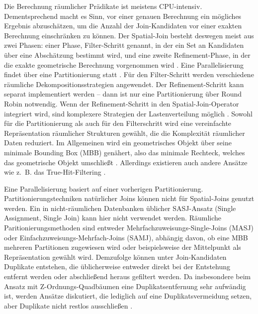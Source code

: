 \documentclass[a4paper,12pt,twoside]{article}
\begin{document}
{Die Berechnung räumlicher Prädikate ist meistens CPU-intensiv. Dementsprechend macht es Sinn, vor einer genauen Berechnung ein mögliches Ergebnis abzuschätzen, um die Anzahl der Join-Kandidaten vor einer exakten Berechnung einschränken zu können. Der Spatial-Join besteht deswegen meist aus zwei Phasen: einer Phase, Filter-Schritt genannt, in der ein Set an Kandidaten über eine Abschätzung bestimmt wird, und eine zweite Refinement-Phase, in der die exakte geometrische Berechnung vorgenommen wird \parencite[S. 309f]{Rigaux2001}. Eine Parallelisierung findet über eine Partitionierung statt \parencite{Zhou1998}. Für den Filter-Schritt werden verschiedene räumliche Dekompositionsstrategien angewendet. Der Refinement-Schritt kann separat implementiert werden -- dann ist nur eine Partitionierung über Round Robin notwendig. Wenn der Refinement-Schritt in den Spatial-Join-Operator integriert wird, sind komplexere Strategien der Lastenverteilung möglich \parencite{Brinkhoff1996}. Sowohl für die Partitionierung als auch für den Filterschritt wird eine vereinfachte Repräsentation räumlicher Strukturen gewählt, die die Komplexität räumlicher Daten reduziert. Im Allgemeinen wird ein geometrisches Objekt über seine minimale Bounding Box (MBB) genähert, also das minimale Rechteck, welches das geometrische Objekt umschließt \parencite[S. 202f]{Rigaux2001}. Allerdings existieren auch andere Ansätze wie z.~B. das True-Hit-Filtering \parencite{Bouros2019}.

Eine Parallelisierung basiert auf einer vorherigen Partitionierung. Partitionierungstechniken natürlicher Joins können nicht für Spatial-Joins genutzt werden. Ein in nicht-räumlichen Datenbanken üblicher SASJ-Ansatz (Single Assignment, Single Join) kann hier nicht verwendet werden. Räumliche Paritionierungsmethoden sind entweder Mehrfachzuweisungs-Single-Joins (MASJ) oder Einfachzuweisungs-Mehrfach-Joins (SAMJ), abhängig davon, ob eine MBB mehreren Partitionen zugewiesen wird oder beispielsweise der Mittelpunkt als Repräsentation gewählt wird. Demzufolge können unter Join-Kandidaten Duplikate entstehen, die üblicherweise entweder direkt bei der Entstehung entfernt werden oder abschließend heraus gefiltert werden. Da insbesondere beim Ansatz mit Z-Ordnungs-Quadbäumen eine Duplikatsentfernung sehr aufwändig ist, werden Ansätze diskutiert, die lediglich auf eine Duplikatsvermeidung setzen, aber Duplikate nicht restlos ausschließen \parencite{Jacox2007, Luo2002}. 

}
\end{document}

